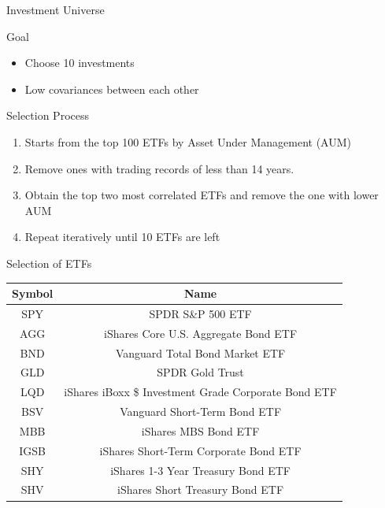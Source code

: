 \begin{frame}{Investment Universe}
\begin{block}{Goal}
\begin{itemize}
    \item Choose 10 investments
    \item Low covariances between each other
\end{itemize}
\end{block}
\begin{block}{Selection Process}
    \begin{enumerate}
    \item Starts from the top 100 ETFs by Asset Under Management (AUM)
    \item Remove ones with trading records of less than 14 years.
    \item \label{itm:remove_items} Obtain the top two most correlated ETFs and remove the one with lower AUM
    \item Repeat \mynum{\ref{itm:remove_items}} iteratively until 10 ETFs are left
    \end{enumerate}
\end{block}
\end{frame}

\begin{frame}{Selection of ETFs}
    \begin{tabular}{|| c | c ||}
    \hline
    Symbol & Name  \\ \hline \hline
    SPY&SPDR S\&P 500 ETF \\ \hline
    AGG&iShares Core U.S. Aggregate Bond ETF \\ \hline
    BND&Vanguard Total Bond Market ETF \\ \hline
    GLD&SPDR Gold Trust \\ \hline
    LQD&iShares iBoxx \$ Investment Grade Corporate Bond ETF \\ \hline
    BSV&Vanguard Short-Term Bond ETF \\ \hline
    MBB&iShares MBS Bond ETF \\ \hline
    IGSB&iShares Short-Term Corporate Bond ETF \\ \hline
    SHY&iShares 1-3 Year Treasury Bond ETF \\ \hline
    SHV&iShares Short Treasury Bond ETF \\ \hline
    \end{tabular}
\end{frame}

